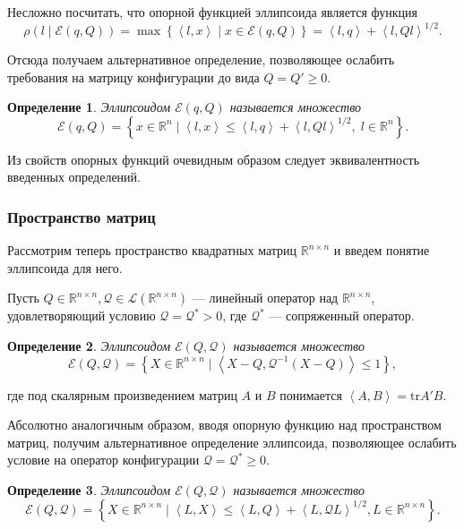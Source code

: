 \documentclass[12pt]{article}
\theoremstyle{rusdef}
\newtheorem{definition}{Определение}
\newcommand{\scalar}[2]{\left<#1,#2\right>}
\newcommand{\R}{\ensuremath{\mathbb{R}}} %
\newcommand{\E}{\ensuremath{\mathcal{E}}} %
\begin{document}
Несложно посчитать, что опорной функцией эллипсоида является функция
$$
\rho(l \mid \E(q,Q)) = \max\left\{ \scalar{l}{x} \mid x \in \E(q,Q) \right\} = \scalar{l}{q} + \scalar{l}{Ql}^{1/2}.
$$

Отсюда получаем альтернативное определение, позволяющее ослабить требования на матрицу конфигурации до вида $Q = Q' \geqslant 0$.

\begin{definition}
Эллипсоидом $\E(q,Q)$ называется множество
$$
\E(q,Q) = \left\{ x \in \R^n \mid \scalar{l}{x} \leqslant \scalar{l}{q} + \scalar{l}{Ql}^{1/2}, \; l \in \R^n \right\}.
$$
\end{definition}

Из свойств опорных функций очевидным образом следует эквивалентность введенных определений.

\subsubsection*{Пространство матриц}
Рассмотрим теперь пространство квадратных матриц $\R^{n \times n}$ и введем понятие эллипсоида для него.

Пусть $Q \in \R^{n \times n}, \mathcal{Q} \in \mathscr{L}(\R^{n \times n})$ --- линейный оператор над $\R^{n \times n}$, удовлетворяющий условию $\mathcal{Q} = \mathcal{Q}^* > 0$, где $\mathcal{Q}^*$ --- сопряженный оператор.

\begin{definition}
Эллипсоидом $\E(Q,\mathcal{Q})$ называется множество
$$
\E(Q,\mathcal{Q}) = \left\{ X \in \R^{n \times n} \mid \scalar{X-Q}{\mathcal{Q}^{-1}(X-Q)} \leqslant 1 \right\},
$$
\end{definition}
где под скалярным произведением матриц $A$ и $B$ понимается $\scalar{A}{B} = \mathrm{tr}A'B$.

Абсолютно аналогичным образом, вводя опорную функцию над пространством матриц, получим альтернативное определение эллипсоида, позволяющее ослабить условие на оператор конфигурации $\mathcal{Q} = \mathcal{Q}^* \geqslant 0$.

\begin{definition}
Эллипсоидом $\E(Q,\mathcal{Q})$ называется множество
$$
\E(Q,\mathcal{Q}) = \left\{ X \in \R^{n \times n} \mid \scalar{L}{X} \leqslant \scalar{L}{Q} + \scalar{L}{\mathcal{Q}L}^{1/2}, L \in \R^{n \times n} \right\}.
$$
\end{definition}
\end{document}
